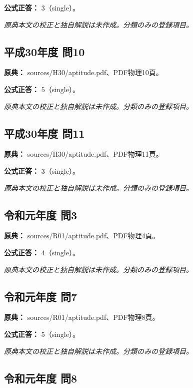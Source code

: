 \textbf{公式正答：} 3（single）。

\par\textit{原典本文の校正と独自解説は未作成。分類のみの登録項目。}

\subsection{平成30年度 問10}
\label{q:h30-reg-apt-10}

\noindent\textbf{原典：} sources/H30/aptitude.pdf、PDF物理10頁。

\textbf{公式正答：} 5（single）。

\par\textit{原典本文の校正と独自解説は未作成。分類のみの登録項目。}

\subsection{平成30年度 問11}
\label{q:h30-reg-apt-11}

\noindent\textbf{原典：} sources/H30/aptitude.pdf、PDF物理11頁。

\textbf{公式正答：} 3（single）。

\par\textit{原典本文の校正と独自解説は未作成。分類のみの登録項目。}

\subsection{令和元年度 問3}
\label{q:r01-reg-apt-03}

\noindent\textbf{原典：} sources/R01/aptitude.pdf、PDF物理4頁。

\textbf{公式正答：} 4（single）。

\par\textit{原典本文の校正と独自解説は未作成。分類のみの登録項目。}

\subsection{令和元年度 問7}
\label{q:r01-reg-apt-07}

\noindent\textbf{原典：} sources/R01/aptitude.pdf、PDF物理8頁。

\textbf{公式正答：} 5（single）。

\par\textit{原典本文の校正と独自解説は未作成。分類のみの登録項目。}

\subsection{令和元年度 問8}
\label{q:r01-reg-apt-08}

